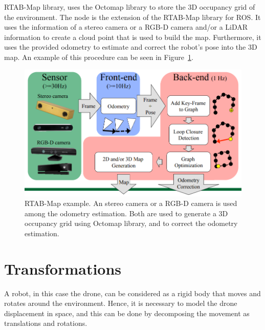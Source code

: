 \ac{RTAB-Map} library, uses the Octomap library to store the 3D occupancy grid of the environment. The  node is the extension of the \ac{RTAB-Map} library for \ac{ROS}. It uses the information of a stereo camera or a RGB-D camera and/or a LiDAR information to create a cloud point that is used to build the map. Furthermore, it uses the provided odometry to estimate and correct the robot's pose into the 3D map. An example of this procedure can be seen in Figure~\ref{fig:chapter1:ros:rtabmap}.

\begin{figure}
    \centering
    \includegraphics[width=\textwidth]{Images/fig14-rtabmap3.png}
    \caption[RTAB-Map example]{\ac{RTAB-Map} example. An stereo camera or a RGB-D camera is used among the odometry estimation. Both are used to generate a 3D occupancy grid using Octomap library, and to correct the odometry estimation. \cite{rtabmap-presentation}}
    \label{fig:chapter1:ros:rtabmap}
\end{figure}

\section{Transformations}
\label{sec:chapter1:transform}
A robot, in this case the drone, can be considered as a rigid body that moves and rotates around the environment. Hence, it is necessary to model the drone displacement in space, and this can be done by decomposing the movement as translations and rotations.

